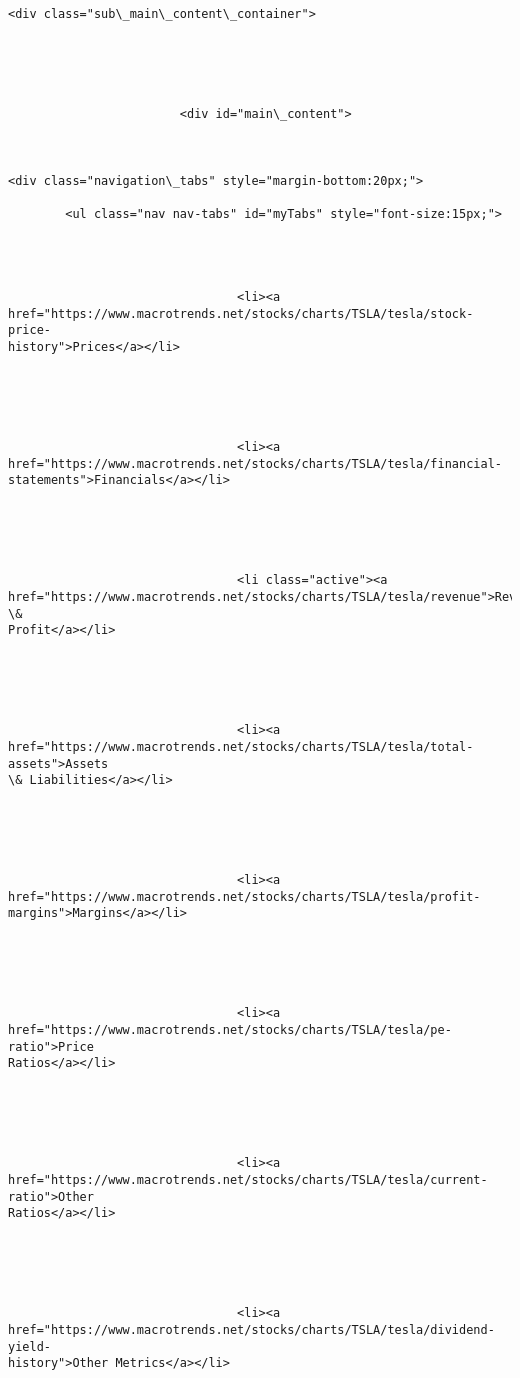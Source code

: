 \documentclass[11pt]{article}
\begin{document}
\begin{Verbatim}[commandchars=\\\{\}]
        <div class="sub\_main\_content\_container">





                        <div id="main\_content">



<div class="navigation\_tabs" style="margin-bottom:20px;">

        <ul class="nav nav-tabs" id="myTabs" style="font-size:15px;">




                                <li><a
href="https://www.macrotrends.net/stocks/charts/TSLA/tesla/stock-price-
history">Prices</a></li>





                                <li><a
href="https://www.macrotrends.net/stocks/charts/TSLA/tesla/financial-
statements">Financials</a></li>





                                <li class="active"><a
href="https://www.macrotrends.net/stocks/charts/TSLA/tesla/revenue">Revenue \&
Profit</a></li>





                                <li><a
href="https://www.macrotrends.net/stocks/charts/TSLA/tesla/total-assets">Assets
\& Liabilities</a></li>





                                <li><a
href="https://www.macrotrends.net/stocks/charts/TSLA/tesla/profit-
margins">Margins</a></li>





                                <li><a
href="https://www.macrotrends.net/stocks/charts/TSLA/tesla/pe-ratio">Price
Ratios</a></li>





                                <li><a
href="https://www.macrotrends.net/stocks/charts/TSLA/tesla/current-ratio">Other
Ratios</a></li>





                                <li><a
href="https://www.macrotrends.net/stocks/charts/TSLA/tesla/dividend-yield-
history">Other Metrics</a></li>




\end{Verbatim}
\end{document}
